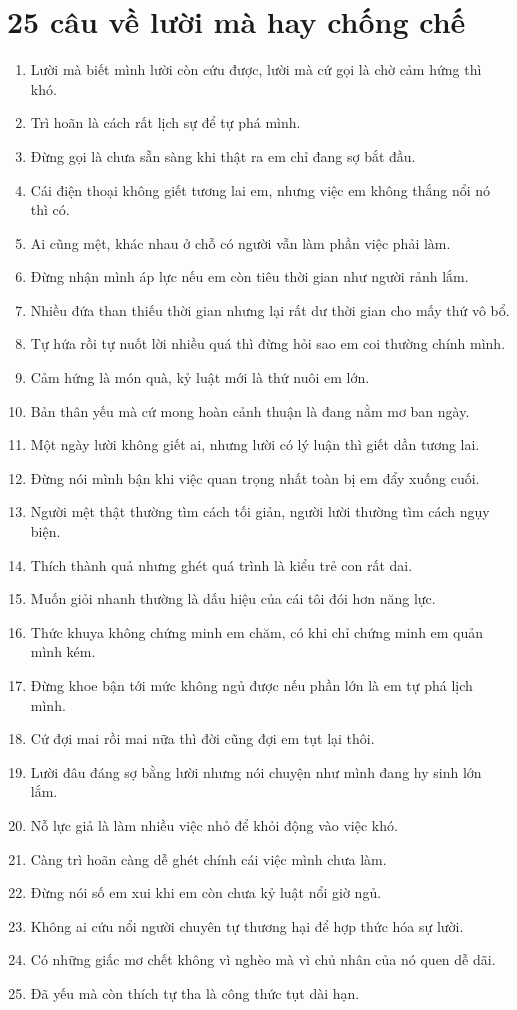\section{25 câu về lười mà hay chống chế}
\begin{enumerate}[leftmargin=*,resume]
\item Lười mà biết mình lười còn cứu được, lười mà cứ gọi là chờ cảm hứng thì khó.
\item Trì hoãn là cách rất lịch sự để tự phá mình.
\item Đừng gọi là chưa sẵn sàng khi thật ra em chỉ đang sợ bắt đầu.
\item Cái điện thoại không giết tương lai em, nhưng việc em không thắng nổi nó thì có.
\item Ai cũng mệt, khác nhau ở chỗ có người vẫn làm phần việc phải làm.
\item Đừng nhận mình áp lực nếu em còn tiêu thời gian như người rảnh lắm.
\item Nhiều đứa than thiếu thời gian nhưng lại rất dư thời gian cho mấy thứ vô bổ.
\item Tự hứa rồi tự nuốt lời nhiều quá thì đừng hỏi sao em coi thường chính mình.
\item Cảm hứng là món quà, kỷ luật mới là thứ nuôi em lớn.
\item Bản thân yếu mà cứ mong hoàn cảnh thuận là đang nằm mơ ban ngày.
\item Một ngày lười không giết ai, nhưng lười có lý luận thì giết dần tương lai.
\item Đừng nói mình bận khi việc quan trọng nhất toàn bị em đẩy xuống cuối.
\item Người mệt thật thường tìm cách tối giản, người lười thường tìm cách ngụy biện.
\item Thích thành quả nhưng ghét quá trình là kiểu trẻ con rất dai.
\item Muốn giỏi nhanh thường là dấu hiệu của cái tôi đói hơn năng lực.
\item Thức khuya không chứng minh em chăm, có khi chỉ chứng minh em quản mình kém.
\item Đừng khoe bận tới mức không ngủ được nếu phần lớn là em tự phá lịch mình.
\item Cứ đợi mai rồi mai nữa thì đời cũng đợi em tụt lại thôi.
\item Lười đâu đáng sợ bằng lười nhưng nói chuyện như mình đang hy sinh lớn lắm.
\item Nỗ lực giả là làm nhiều việc nhỏ để khỏi động vào việc khó.
\item Càng trì hoãn càng dễ ghét chính cái việc mình chưa làm.
\item Đừng nói số em xui khi em còn chưa kỷ luật nổi giờ ngủ.
\item Không ai cứu nổi người chuyên tự thương hại để hợp thức hóa sự lười.
\item Có những giấc mơ chết không vì nghèo mà vì chủ nhân của nó quen dễ dãi.
\item Đã yếu mà còn thích tự tha là công thức tụt dài hạn.
\end{enumerate}

